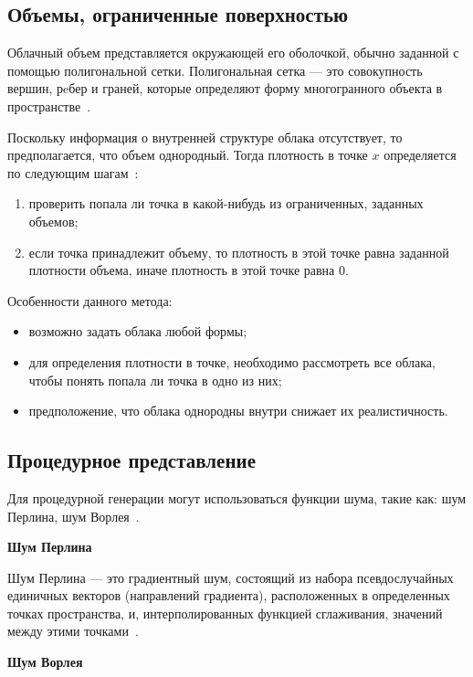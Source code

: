 \subsection{Объемы, ограниченные поверхностью} 
Облачный объем представляется окружающей его оболочкой, обычно заданной с помощью полигональной сетки. Полигональная сетка --- это совокупность вершин, рeбер и граней, которые определяют форму многогранного объекта в пространстве~\cite{mesh}.

Поскольку информация о внутренней структуре облака отсутствует, то предполагается, что объем однородный. Тогда плотность в точке $x$ определяется по следующим шагам~\cite{clouds}: 
\begin{enumerate}
	\item проверить попала ли точка в какой-нибудь из ограниченных, заданных объемов;
	\item если точка принадлежит объему, то плотность в этой точке равна заданной плотности объема, иначе плотность в этой точке равна 0.
\end{enumerate}

Особенности данного метода:
\begin{itemize}
	\item возможно задать облака любой формы;
	\item для определения плотности в точке, необходимо рассмотреть все облака, чтобы понять попала ли точка в одно из них;
	\item предположение, что облака однородны внутри снижает их реалистичность. 
\end{itemize}


\subsection{Процедурное представление} 
\label{implicit}
Для процедурной генерации могут использоваться функции шума, такие как: шум Перлина, шум Ворлея~\cite{frostbite, hzd}. 

\textbf{Шум Перлина}

Шум Перлина --- это градиентный шум, состоящий из набора псевдослучайных единичных векторов (направлений градиента), расположенных в определенных точках пространства, и, интерполированных функцией сглаживания, значений между этими точками~\cite{perlin}.

\textbf{Шум Ворлея}

